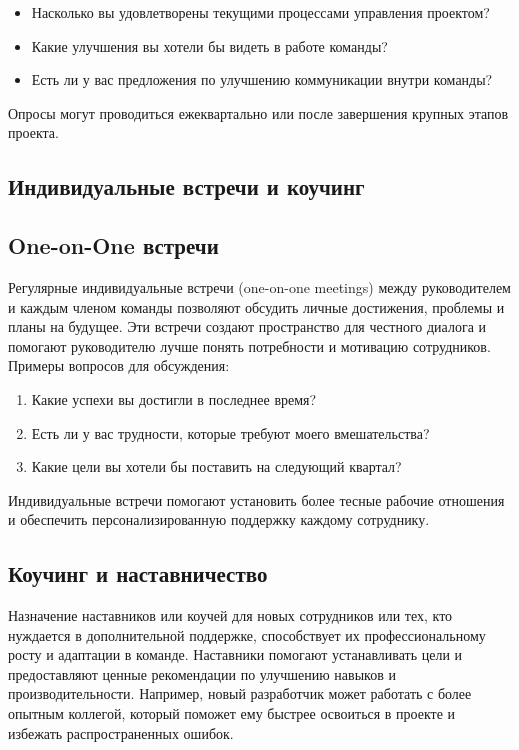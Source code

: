     \begin{itemize}
        \item Насколько вы удовлетворены текущими процессами управления проектом?
        \item Какие улучшения вы хотели бы видеть в работе команды?
        \item Есть ли у вас предложения по улучшению коммуникации внутри команды?
    \end{itemize}
    
    Опросы могут проводиться ежеквартально или после завершения крупных этапов проекта.

    \subsection{Индивидуальные встречи и коучинг}

    \subsection*{One-on-One встречи}
    Регулярные индивидуальные встречи (one-on-one meetings) между руководителем и каждым членом команды позволяют обсудить личные достижения, проблемы и планы на будущее. Эти встречи создают пространство для честного диалога и помогают руководителю лучше понять потребности и мотивацию сотрудников. Примеры вопросов для обсуждения:
    
    \begin{enumerate}
        \item Какие успехи вы достигли в последнее время?
        \item Есть ли у вас трудности, которые требуют моего вмешательства?
        \item Какие цели вы хотели бы поставить на следующий квартал?
    \end{enumerate}
    
    Индивидуальные встречи помогают установить более тесные рабочие отношения и обеспечить персонализированную поддержку каждому сотруднику.

    \subsection*{Коучинг и наставничество}
    Назначение наставников или коучей для новых сотрудников или тех, кто нуждается в дополнительной поддержке, способствует их профессиональному росту и адаптации в команде. Наставники помогают устанавливать цели и предоставляют ценные рекомендации по улучшению навыков и производительности. Например, новый разработчик может работать с более опытным коллегой, который поможет ему быстрее освоиться в проекте и избежать распространенных ошибок.


